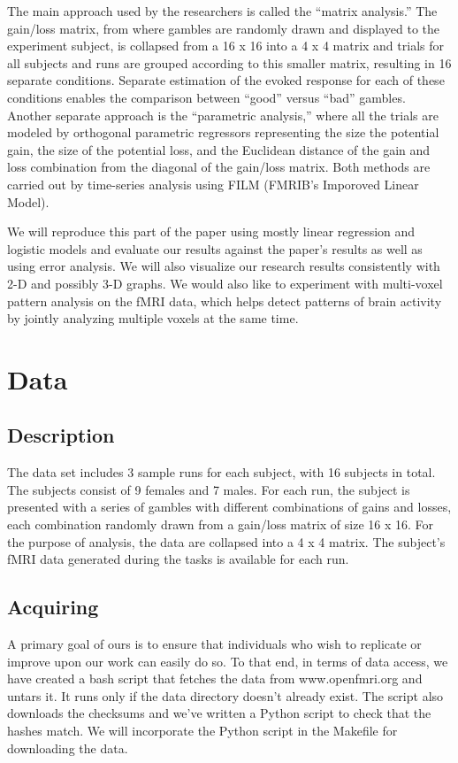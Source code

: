 \documentclass[11pt]{article}
\begin{document}
The main approach used by the researchers is called the ``matrix analysis.''
The gain/loss matrix, from where gambles are randomly drawn and displayed to
the experiment subject, is collapsed from a 16 x 16 into a 4 x 4 matrix and
trials for all subjects and runs are grouped according to this smaller matrix,
resulting in 16 separate conditions. Separate estimation of the evoked response
for each of these conditions enables the comparison between ``good'' versus
``bad'' gambles. Another separate approach is the ``parametric analysis,''
where all the trials are modeled by orthogonal parametric regressors
representing the size the potential gain, the size of the potential loss, and
the Euclidean distance of the gain and loss combination from the diagonal of
the gain/loss matrix. Both methods are carried out by time-series analysis
using FILM (FMRIB’s Imporoved Linear Model).

We will reproduce this part of the paper using mostly linear regression and
logistic models and evaluate our results against the paper’s results as well as
using error analysis. We will also visualize our research results consistently
with 2-D and possibly 3-D graphs. We would also like to experiment with
multi-voxel pattern analysis on the fMRI data, which helps detect patterns of
brain activity by jointly analyzing multiple voxels at the same time. 

\section{Data}

\subsection{Description}

The data set includes 3 sample runs for each subject, with 16 subjects in
total. The subjects consist of 9 females and 7 males. For each run, the subject
is presented with a series of gambles with different combinations of gains and
losses, each combination randomly drawn from a gain/loss matrix of size 16 x
16. For the purpose of analysis, the data are collapsed into a 4 x 4 matrix.
The subject’s fMRI data generated during the tasks is available for each run.

\subsection{Acquiring}

A primary goal of ours is to ensure that individuals who wish to replicate or
improve upon our work can easily do so. To that end, in terms of data access,
we have created a bash script that fetches the data from www.openfmri.org and
untars it. It runs only if the data directory doesn't already exist. The script
also downloads the checksums and we've written a Python script to check that
the hashes match. We will incorporate the Python script in the Makefile for
downloading the data.
\end{document}
